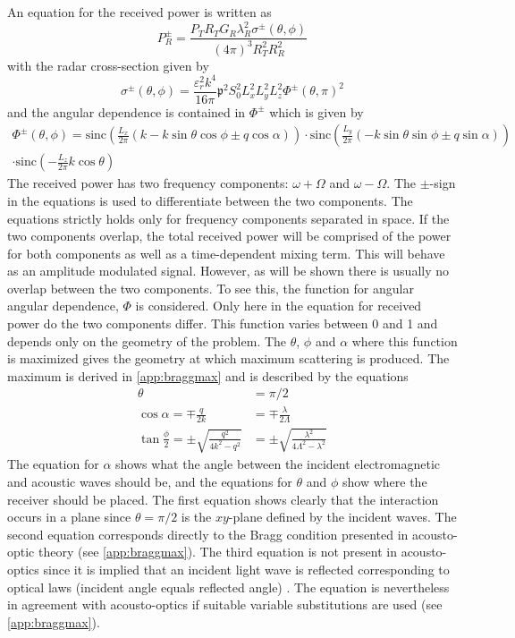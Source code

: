\documentclass[10pt,a4paper,draft]{scrartcl}
\begin{document}
	An equation for the received power is written as
	\begin{equation*}
	P_R^\pm = \frac{P_T R_T G_R \lambda_R^2 \sigma^\pm (\theta,\phi)}{(4\pi)^3 R_T^2 R_R^2}
	\end{equation*}
	with the radar cross-section given by
	\begin{equation*}
	\sigma^\pm (\theta, \phi) = \frac{\varepsilon_r^2 k^4}{16\pi} \mathfrak{p}^2 S_0^2 L_x^2 L_y^2 L_z^2 \Phi^\pm (\theta,\pi)^2
	\end{equation*}
	and the angular dependence is contained in $\Phi^\pm$ which is given by
	\begin{multline*}
	\Phi^\pm(\theta,\phi) = \text{sinc} \left( \frac{L_x}{2\pi} \left( k - k\sin{\theta}\cos{\phi} \pm q\cos{\alpha} \right) \right) 
	\cdot \text{sinc} \left( \frac{L_y}{2\pi} \left( -k\sin{\theta}\sin{\phi} \pm q\sin{\alpha} \right) \right) \\
	\cdot \text{sinc} \left( -\frac{L_z}{2\pi} k\cos{\theta} \right)
	\end{multline*}
	The received power has two frequency components: $\omega + \Omega$ and $\omega - \Omega$. The $\pm$-sign in the equations is used to differentiate between the two components. The equations strictly holds only for frequency components separated in space. If the two components overlap, the total received power will be comprised of the power for both components as well as a time-dependent mixing term. This will behave as an amplitude modulated signal. However, as will be shown there is usually no overlap between the two components. To see this, the function for angular angular dependence, $\Phi$ is considered. Only here in the equation for received power do the two components differ. This function varies between 0 and 1 and depends only on the geometry of the problem. The $\theta$, $\phi$ and $\alpha$ where this function is maximized gives the geometry at which maximum scattering is produced. The maximum is derived in \ref{app:braggmax} and is described by the equations
	\begin{align*}
		\theta &= \pi/2 \\
		\cos{\alpha} = \mp \frac{q}{2k} &= \mp \frac{\lambda}{2\Lambda} \\
		\tan{\frac{\phi}{2}} = \pm \sqrt{\frac{q^2}{4k^2-q^2}} &= \pm \sqrt{\frac{\lambda^2}{4\Lambda^2-\lambda^2}}
	\end{align*}
	The equation for $\alpha$ shows what the angle between the incident electromagnetic and acoustic waves should be, and the equations for $\theta$ and $\phi$ show where the receiver should be placed. The first equation shows clearly that the interaction occurs in a plane since $\theta = \pi/2$ is the $xy$-plane defined by the incident waves. The second equation corresponds directly to the Bragg condition presented in acousto-optic theory (see \ref{app:braggmax}). The third equation is not present in acousto-optics since it is implied that an incident light wave is reflected corresponding to optical laws (incident angle equals reflected angle) \cite{Saleh2007}. The equation is nevertheless in agreement with acousto-optics if suitable variable substitutions are used (see \ref{app:braggmax}).
	
\end{document}
